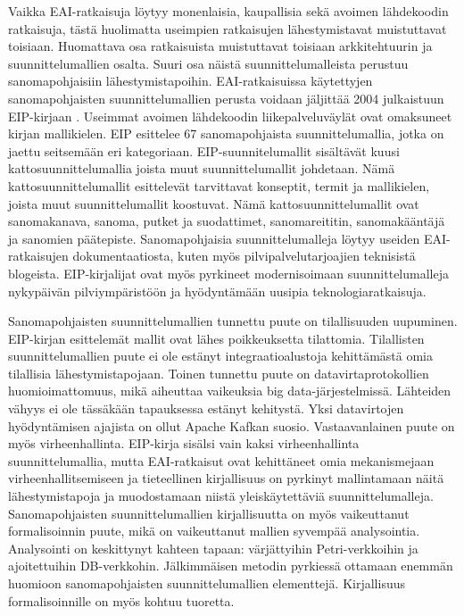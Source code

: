 Vaikka EAI-ratkaisuja löytyy monenlaisia, kaupallisia sekä avoimen lähdekoodin ratkaisuja, tästä huolimatta useimpien ratkaisujen lähestymistavat muistuttavat toisiaan.
Huomattava osa ratkaisuista muistuttavat toisiaan arkkitehtuurin ja suunnittelumallien osalta. Suuri osa näistä suunnittelumalleista perustuu sanomapohjaisiin lähestymistapoihin.
EAI-ratkaisuissa käytettyjen sanomapohjaisten suunnittelumallien perusta voidaan jäljittää 2004 julkaistuun EIP-kirjaan \citep{Hohpe2004}. Useimmat avoimen lähdekoodin liikepalveluväylät ovat omaksuneet kirjan mallikielen. 
EIP esittelee 67 sanomapohjaista suunnittelumallia, jotka on jaettu seitsemään eri kategoriaan.
EIP-suunnitelumallit sisältävät kuusi kattosuunnittelumallia joista muut suunnittelumallit johdetaan. Nämä kattosuunnittelumallit esittelevät tarvittavat konseptit, termit ja mallikielen, joista muut suunnittelumallit koostuvat. Nämä kattosuunnittelumallit ovat sanomakanava, sanoma, putket ja suodattimet, sanomareititin, sanomakääntäjä ja sanomien päätepiste.
Sanomapohjaisia suunnittelumalleja löytyy useiden EAI-ratkaisujen dokumentaatiosta, kuten myös pilvipalvelutarjoajien teknisistä blogeista. EIP-kirjalijat ovat myös pyrkineet modernisoimaan suunnittelumalleja nykypäivän pilviympäristöön ja hyödyntämään uusipia teknologiaratkaisuja.

Sanomapohjaisten suunnittelumallien tunnettu puute on tilallisuuden uupuminen. EIP-kirjan esittelemät mallit ovat lähes poikkeuksetta tilattomia. Tilallisten suunnittelumallien puute ei ole estänyt integraatioalustoja kehittämästä omia tilallisia lähestymistapojaan. Toinen tunnettu puute on datavirtaprotokollien huomioimattomuus, mikä aiheuttaa vaikeuksia big data-järjestelmissä. Lähteiden vähyys ei ole tässäkään tapauksessa estänyt kehitystä. Yksi datavirtojen hyödyntämisen ajajista on ollut Apache Kafkan suosio. Vastaavanlainen puute on myös virheenhallinta. EIP-kirja sisälsi vain kaksi virheenhallinta suunnittelumallia, mutta EAI-ratkaisut ovat kehittäneet omia mekanismejaan virheenhallitsemiseen ja tieteellinen kirjallisuus on pyrkinyt mallintamaan näitä lähestymistapoja ja muodostamaan niistä yleiskäytettäviä suunnittelumalleja.
Sanomapohjaisten suunnittelumallien kirjallisuutta on myös vaikeuttanut formalisoinnin puute, mikä on vaikeuttanut mallien syvempää analysointia. Analysointi on keskittynyt kahteen tapaan: värjättyihin Petri-verkkoihin ja ajoitettuihin DB-verkkohin. Jälkimmäisen metodin pyrkiessä ottamaan enemmän huomioon sanomapohjaisten suunnittelumallien elementtejä. Kirjallisuus formalisoinnille on myös kohtuu tuoretta.

